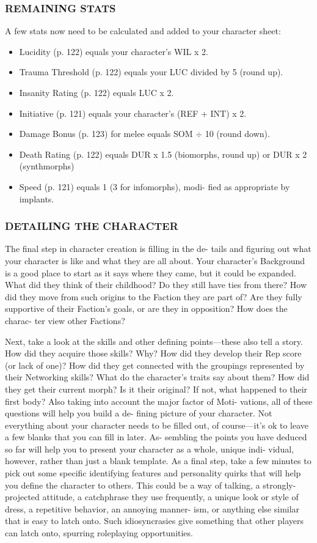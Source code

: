 \subsubsection{REMAINING STATS}
A few stats now need to be calculated and added to
your character sheet:
\begin{itemize}
\item Lucidity (p. 122) equals your character’s WIL x 2.
\item Trauma Threshold (p. 122) equals your LUC
divided by 5 (round up).
\item Insanity Rating (p. 122) equals LUC x 2.
\item Initiative (p. 121) equals your character’s (REF +
INT) x 2.
\item Damage Bonus (p. 123) for melee equals SOM $\div$
10 (round down).
\item Death Rating (p. 122) equals DUR x
1.5 (biomorphs, round up) or DUR x 2
(synthmorphs)
\item Speed (p. 121) equals 1 (3 for infomorphs), modi-
fied as appropriate by implants.
\end{itemize}

\subsubsection{DETAILING THE CHARACTER}
The final step in character creation is filling in the de-
tails and figuring out what your character is like and
what they are all about. Your character’s Background
is a good place to start as it says where they came, but
it could be expanded. What did they think of their
childhood? Do they still have ties from there? How
did they move from such origins to the Faction they
are part of? Are they fully supportive of their Faction’s
goals, or are they in opposition? How does the charac-
ter view other Factions?

Next, take a look at the skills and other defining
points—these also tell a story. How did they acquire
those skills? Why? How did they develop their Rep
score (or lack of one)? How did they get connected
with the groupings represented by their Networking
skills? What do the character’s traits say about them?
How did they get their current morph? Is it their
original? If not, what happened to their first body?
Also taking into account the major factor of Moti-
vations, all of these questions will help you build a de-
fining picture of your character. Not everything about
your character needs to be filled out, of course—it’s
ok to leave a few blanks that you can fill in later. As-
sembling the points you have deduced so far will help
you to present your character as a whole, unique indi-
vidual, however, rather than just a blank template.
As a final step, take a few minutes to pick out some
specific identifying features and personality quirks that
will help you define the character to others. This could
be a way of talking, a strongly-projected attitude, a
catchphrase they use frequently, a unique look or style
of dress, a repetitive behavior, an annoying manner-
ism, or anything else similar that is easy to latch onto.
Such idiosyncrasies give something that other players
can latch onto, spurring roleplaying opportunities.

